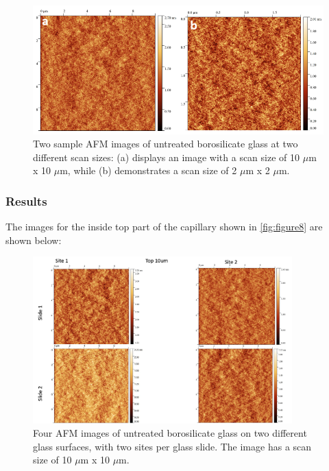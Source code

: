 \begin{figure}[h]     %
        \begin{center}
          \includegraphics[width=120mm]{chapter3/Figure9.png}
\end{center}
\caption{Two sample AFM images of untreated borosilicate glass at two different scan sizes: (a) displays an image with a scan size of 10 $\mu$m x 10 $\mu$m, while (b) demonstrates a scan size of 2 $\mu$m x 2 $\mu$m.}
\label{fig:figure9}                 %
\end{figure}   

\newpage
\subsubsection{Results}

The images for the inside top part of the capillary shown in \ref{fig:figure8} are shown below:

\begin{figure}[h!!!!]     %
        \begin{center}
          \includegraphics[width=100mm]{chapter3/Top 10um.png}
\end{center}
\caption{Four AFM images of untreated borosilicate glass on two different glass surfaces, with two sites per glass slide. The image has a scan size of 10 $\mu$m x 10 $\mu$m.}
\label{fig:figure9}                 %
\end{figure}   


